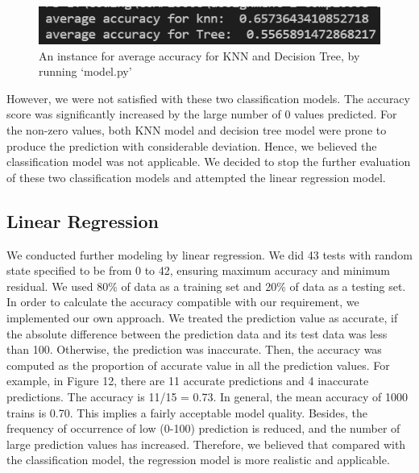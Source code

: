 \documentclass[a4, 11pt]{article}
\begin{document}
\begin{figure}[ht]
    \centering
    \includegraphics[width=1\textwidth]{captures for report/Average accuracy.png}
    \caption{An instance for average accuracy for KNN and Decision Tree, by running ‘model.py’}
    \label{fig:my_label}
\end{figure}
However, we were not satisfied with these two classification models. The accuracy score was significantly increased by the large number of 0 values predicted. For the non-zero values, both KNN model and decision tree model were prone to produce the prediction with considerable deviation. Hence, we believed the classification model was not applicable. We decided to stop the further evaluation of these two classification models and attempted the linear regression model.

\subsection{Linear Regression}
We conducted further modeling by linear regression. We did 43 tests with random state specified to be from 0 to 42, ensuring maximum accuracy and minimum residual. We used 80\% of data as a training set and 20\% of data as a testing set.
In order to calculate the accuracy compatible with our requirement, we implemented our own approach. We treated the prediction value as accurate, if the absolute difference between the prediction data and its test data was less than 100. Otherwise, the prediction was inaccurate. Then, the accuracy was computed as the proportion of accurate value in all the prediction values. For example, in  Figure 12, there are 11 accurate predictions and 4 inaccurate predictions. The accuracy is 11/15 = 0.73.
In general, the mean accuracy of 1000 trains is 0.70. This implies a fairly acceptable model quality. Besides, the frequency of occurrence of low (0-100) prediction is reduced, and the number of large prediction values has increased. Therefore, we believed that compared with the classification model, the regression model is more realistic and applicable.\\\\\\\\\\\\\\\\\\\\\\
\end{document}
